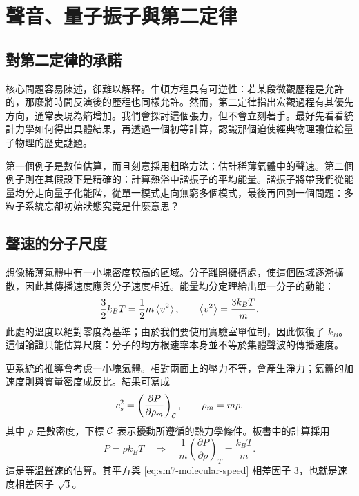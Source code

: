 \chapter{聲音、量子振子與第二定律}


\section{對第二定律的承諾}

核心問題容易陳述，卻難以解釋。牛頓方程具有可逆性：若某段微觀歷程是允許的，那麼將時間反演後的歷程也同樣允許。然而，第二定律指出宏觀過程有其優先方向，通常表現為熵增加。我們會探討這個張力，但不會立刻著手。最好先看看統計力學如何得出具體結果，再透過一個初等計算，認識那個迫使經典物理讓位給量子物理的歷史謎題。

第一個例子是數值估算，而且刻意採用粗略方法：估計稀薄氣體中的聲速。第二個例子則在其假設下是精確的：計算熱浴中諧振子的平均能量。諧振子將帶我們從能量均分走向量子化能階，從單一模式走向無窮多個模式，最後再回到一個問題：多粒子系統忘卻初始狀態究竟是什麼意思？

\section{聲速的分子尺度}

想像稀薄氣體中有一小塊密度較高的區域。分子離開擁擠處，使這個區域逐漸擴散，因此其傳播速度應與分子速度相近。能量均分定理給出單一分子的動能：
\begin{equation}
 \frac{3}{2}k_B T
 =\frac{1}{2}m\left\langle v^2\right\rangle,
 \qquad
 \left\langle v^2\right\rangle=\frac{3k_B T}{m}.
 \label{eq:sm7-molecular-speed}
\end{equation}
此處的溫度以絕對零度為基準；由於我們要使用實驗室單位制，因此恢復了 \(k_B\)。這個論證只能估算尺度：分子的均方根速率本身並不等於集體聲波的傳播速度。

更系統的推導會考慮一小塊氣體。相對兩面上的壓力不等，會產生淨力；氣體的加速度則與質量密度成反比。結果可寫成
\begin{equation}
 c_s^2=
 \left(\frac{\partial P}{\partial \rho_m}\right)_{\cal C},
 \qquad
 \rho_m=m\rho,
 \label{eq:sm7-sound-general}
\end{equation}
其中 \(\rho\) 是數密度，下標 \({\cal C}\) 表示擾動所遵循的熱力學條件。板書中的計算採用
\begin{equation}
 P=\rho k_B T
 \quad\Longrightarrow\quad
 \frac{1}{m}
 \left(\frac{\partial P}{\partial\rho}\right)_T
 =\frac{k_B T}{m}.
 \label{eq:sm7-sound-isothermal}
\end{equation}
這是等溫聲速的估算。其平方與 \eqref{eq:sm7-molecular-speed} 相差因子 \(3\)，也就是速度相差因子 \(\sqrt{3}\)。

